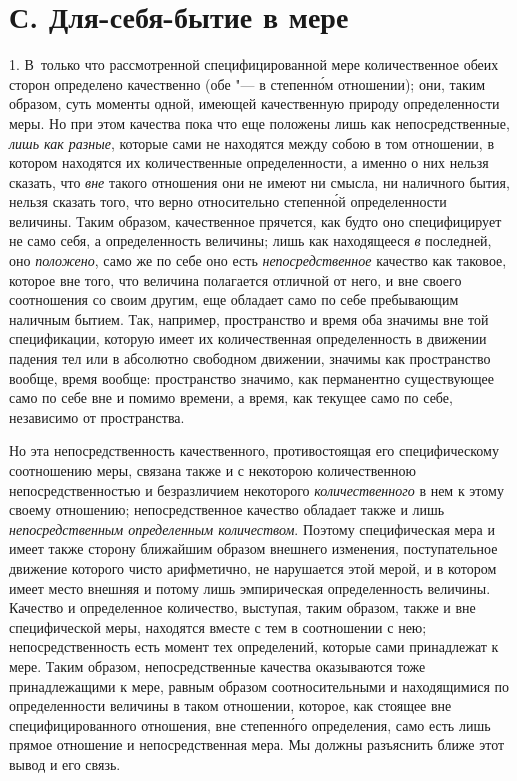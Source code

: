 \section[С. Для-себя-бытие в мере]{С. Для-себя-бытие в мере}
1. В~только что рассмотренной специфицированной мере количественное обеих
сторон определено качественно (обе "--- в степенн\'{о}м отношении);
они, таким образом, суть моменты одной, имеющей качественную
природу определенности меры. Но при этом качества пока что еще положены
лишь как непосредственные, {\em лишь как разные},
которые сами не находятся между собою в том отношении, в котором находятся
их количественные определенности, а именно о них нельзя сказать, что
{\em вне} такого отношения они не имеют ни смысла, ни
наличного бытия, нельзя сказать того, что верно относительно степенн\'{о}й
определенности величины. Таким образом, качественное прячется, как будто
оно специфицирует не само себя, а определенность величины; лишь как
находящееся {\em в} последней, оно {\em положено}, само же по себе оно есть
{\em непосредственное} качество как таковое, которое
вне того, что величина полагается отличной от него, и вне своего
соотношения со своим другим, еще обладает само по себе пребывающим наличным
бытием. Так, например, пространство и время оба значимы вне той
спецификации, которую имеет их количественная определенность в движении
падения тел или в абсолютно свободном движении, значимы как пространство
вообще, время вообще: пространство значимо, как перманентно существующее
само по себе вне и помимо времени, а время, как текущее само по себе,
независимо от пространства.

Но эта непосредственность качественного, противостоящая его специфическому
соотношению меры, связана также и с некоторою количественною
непосредственностью и безразличием некоторого
{\em количественного} в нем к этому своему отношению;
непосредственное качество обладает также и лишь
{\em непосредственным определенным количеством}.
Поэтому специфическая мера и имеет также сторону ближайшим образом внешнего
изменения, поступательное движение которого чисто арифметично, не
нарушается этой мерой, и в котором имеет место внешняя и потому лишь
эмпирическая определенность величины. Качество и определенное количество,
выступая, таким образом, также и вне специфической меры, находятся вместе с
тем в соотношении с нею; непосредственность есть момент тех определений,
которые сами принадлежат к мере. Таким образом, непосредственные качества
оказываются тоже принадлежащими к мере, равным образом соотносительными и
находящимися по определенности величины в таком отношении, которое, как
стоящее вне специфицированного отношения, вне степенн\'{о}го определения, само
есть лишь прямое отношение и непосредственная мера. Мы должны разъяснить
ближе этот вывод и его связь.

